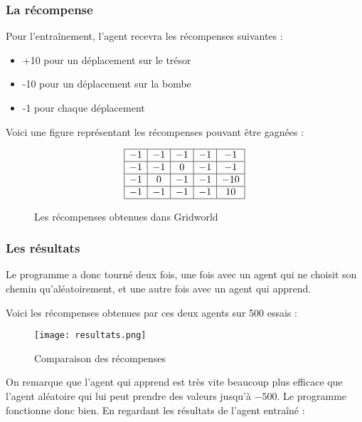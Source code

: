 \newpage
\subsubsection*{La récompense}

Pour l'entraînement, l'agent recevra les récompenses suivantes : 

\begin{itemize}
\item +10 pour un déplacement sur le trésor
\item -10 pour un déplacement sur la bombe
\item -1 pour chaque déplacement
\end{itemize}

Voici une figure représentant les récompenses pouvant être gagnées : \medskip
\begin{figure}[!h]
\centering
$$\begin{array}{|c|c|c|c|c|}
\hline
-1 & -1 & -1 & -1 & -1 \\
\hline
-1 & -1 & 0 & -1 & -1 \\
\hline
-1 & 0 & -1 & -1 & -10 \\
\hline
-1 & -1 & -1 & -1 & 10 \\
\hline
\end{array}
$$

\caption{Les récompenses obtenues dans Gridworld}
\label{recomp}
\end{figure}


\subsubsection*{Les résultats}

Le programme a donc tourné deux fois, une fois avec un agent qui ne choisit son chemin qu'aléatoirement, et une autre fois avec un agent qui apprend.

Voici les récompenses obtenues par ces deux agents sur 500 essais : 

\begin{figure}[!ht]
\hspace*{0cm}\texttt{[image: resultats.png]}
\caption{Comparaison des récompenses}
\label{recompgraph}
\end{figure}

On remarque que l'agent qui apprend est très vite beaucoup plus efficace que l'agent aléatoire qui lui peut prendre des valeurs jusqu'à $-500$. Le programme fonctionne donc bien. En regardant les résultats de l'agent entraîné : 

